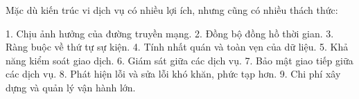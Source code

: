 
Mặc dù kiến trúc vi dịch vụ có nhiều lợi ích, nhưng cũng có nhiều thách thức:

1. Chịu ảnh hưởng của đường truyền mạng.
2. Đồng bộ   đồng hồ thời gian.
3. Ràng buộc về thứ tự sự kiện.
4. Tính nhất quán và toàn vẹn của dữ liệu.
5. Khả năng kiểm soát giao dịch.
6. Giám sát giữa các dịch vụ.
7. Bảo mật giao tiếp giữa các dịch vụ.
8. Phát hiện lỗi và sửa lỗi khó khăn, phức tạp hơn.
9. Chi phí xây dựng và quản lý vận hành lớn.